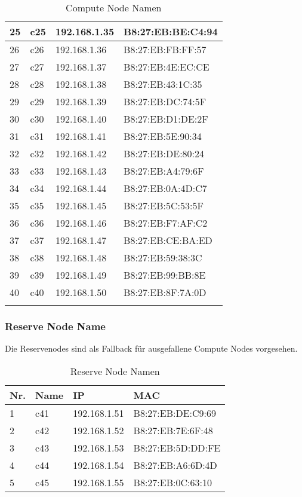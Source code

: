 \begin{longtable}{p{1cm}p{2cm}p{6cm}p{6cm}}
25 & c25 & 192.168.1.35 & B8:27:EB:BE:C4:94\\\hline
26 & c26 & 192.168.1.36 & B8:27:EB:FB:FF:57\\\hline
27 & c27 & 192.168.1.37 & B8:27:EB:4E:EC:CE\\\hline
28 & c28 & 192.168.1.38 & B8:27:EB:43:1C:35\\\hline
29 & c29 & 192.168.1.39 & B8:27:EB:DC:74:5F\\\hline
30 & c30 & 192.168.1.40 & B8:27:EB:D1:DE:2F\\\hline
31 & c31 & 192.168.1.41 & B8:27:EB:5E:90:34\\\hline
32 & c32 & 192.168.1.42 & B8:27:EB:DE:80:24\\\hline
33 & c33 & 192.168.1.43 & B8:27:EB:A4:79:6F\\\hline
34 & c34 & 192.168.1.44 & B8:27:EB:0A:4D:C7\\\hline
35 & c35 & 192.168.1.45 & B8:27:EB:5C:53:5F\\\hline
36 & c36 & 192.168.1.46 & B8:27:EB:F7:AF:C2\\\hline
37 & c37 & 192.168.1.47 & B8:27:EB:CE:BA:ED\\\hline
38 & c38 & 192.168.1.48 & B8:27:EB:59:38:3C\\\hline
39 & c39 & 192.168.1.49 & B8:27:EB:99:BB:8E\\\hline
40 & c40 & 192.168.1.50 & B8:27:EB:8F:7A:0D\\\hline
\caption{Compute Node Namen}
\end{longtable}


\subsubsection{Reserve Node Name}
Die Reservenodes sind als Fallback für ausgefallene Compute Nodes vorgesehen.
\begin{table}[H]
\centering
\begin{tabular}{p{1cm}p{2cm}p{6cm}p{6cm}}
\hline
\rowcolor{heading} \textbf{Nr.} & \textbf{Name} & \textbf{IP} & \textbf{MAC} \\\hline
1 & c41 & 192.168.1.51 & B8:27:EB:DE:C9:69 \\\hline
2 & c42 & 192.168.1.52 & B8:27:EB:7E:6F:48 \\\hline
3 & c43 & 192.168.1.53 & B8:27:EB:5D:DD:FE \\\hline
4 & c44 & 192.168.1.54 & B8:27:EB:A6:6D:4D \\\hline
5 & c45 & 192.168.1.55 & B8:27:EB:0C:63:10 \\\hline
\end{tabular}
\caption{Reserve Node Namen}
\end{table}